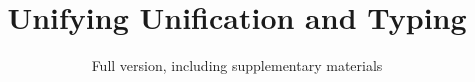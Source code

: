 \documentclass[acmsmall,10pt,review,anonymous, dvipsnames]{acmart}\settopmatter{printfolios=true}
\begin{document}
\title{Unifying Unification and Typing}
\ifdefined\submitoption
\subtitle{Full version, including supplementary materials}         %
\fi

\begin{abstract}


\end{abstract}






\maketitle



% 


\ifdefined\submitoption
\fi

\end{document}
